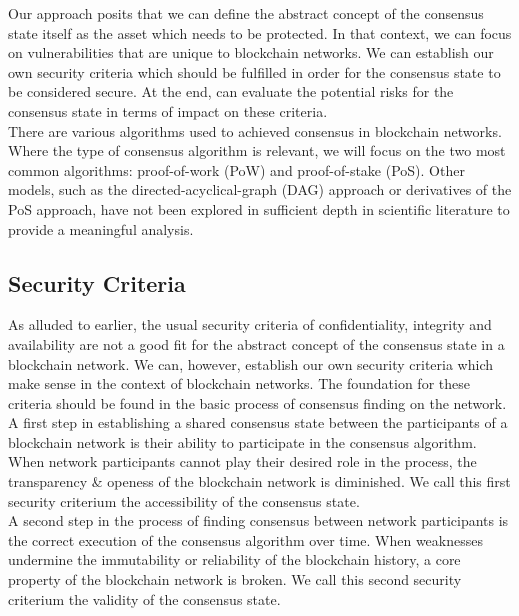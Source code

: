 \documentclass[11pt,a4paper,draft]{article}
\begin{document}
Our approach posits that we can define the abstract concept of the consensus state itself as the asset which needs to be protected. In that context, we can focus on vulnerabilities that are unique to blockchain networks. We can establish our own security criteria which should be fulfilled in order for the consensus state to be considered secure. At the end, can evaluate the potential risks for the consensus state in terms of impact on these criteria.\\

There are various algorithms used to achieved consensus in blockchain networks. Where the type of consensus algorithm is relevant, we will focus on the two most common algorithms: proof-of-work (PoW) and proof-of-stake (PoS). Other models, such as the directed-acyclical-graph (DAG) approach or derivatives of the PoS approach, have not been explored in sufficient depth in scientific literature to provide a meaningful analysis.\\

\subsection{Security Criteria}

As alluded to earlier, the usual security criteria of confidentiality, integrity and availability are not a good fit for the abstract concept of the consensus state in a blockchain network. We can, however, establish our own security criteria which make sense in the context of blockchain networks. The foundation for these criteria should be found in the basic process of consensus finding on the network.\\

A first step in establishing a shared consensus state between the participants of a blockchain network is their ability to participate in the consensus algorithm. When network participants cannot play their desired role in the process, the transparency \& openess of the blockchain network is diminished. We call this first security criterium the accessibility of the consensus state.\\

A second step in the process of finding consensus between network participants is the correct execution of the consensus algorithm over time. When weaknesses undermine the immutability or reliability of the blockchain history, a core property of the blockchain network is broken. We call this second security criterium the validity of the consensus state.\\
\end{document}
